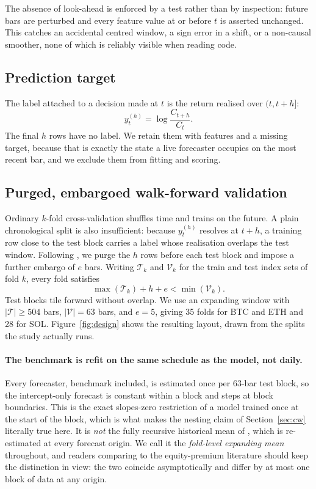 \documentclass{article}
\theoremstyle{plain}
\theoremstyle{definition}
\begin{document}
The absence of look-ahead is enforced by a test rather than by inspection: future
bars are perturbed and every feature value at or before $t$ is asserted unchanged.
This catches an accidental centred window, a sign error in a shift, or a
non-causal smoother, none of which is reliably visible when reading code.

\subsection{Prediction target}

The label attached to a decision made at $t$ is the return realised over
$(t, t+h]$:
%
\begin{equation}
  y_t^{(h)} = \log \frac{C_{t+h}}{C_t}.
\end{equation}
%
The final $h$ rows have no label. We retain them with features and a missing
target, because that is exactly the state a live forecaster occupies on the most
recent bar, and we exclude them from fitting and scoring.

\subsection{Purged, embargoed walk-forward validation}
\label{sec:cv}

Ordinary $k$-fold cross-validation shuffles time and trains on the future. A plain
chronological split is also insufficient: because $y_t^{(h)}$ resolves at $t+h$, a
training row close to the test block carries a label whose realisation overlaps
the test window. Following \citet{lopezdeprado2018}, we purge the $h$ rows before
each test block and impose a further embargo of $e$ bars. Writing $\mathcal{T}_k$
and $\mathcal{V}_k$ for the train and test index sets of fold $k$, every fold
satisfies
%
\begin{equation}
  \max(\mathcal{T}_k) + h + e < \min(\mathcal{V}_k).
  \label{eq:purge}
\end{equation}
%
Test blocks tile forward without overlap. We use an expanding window with
$|\mathcal{T}| \ge 504$ bars, $|\mathcal{V}| = 63$ bars, and $e = 5$, giving 35
folds for BTC and ETH and 28 for SOL. Figure~\ref{fig:design} shows the resulting
layout, drawn from the splits the study actually runs.

\paragraph{The benchmark is refit on the same schedule as the model, not daily.}
Every forecaster, benchmark included, is estimated once per 63-bar test block, so the
intercept-only forecast is constant within a block and steps at block boundaries. This is
the exact slopes-zero restriction of a model trained once at the start of the block, which is
what makes the nesting claim of Section~\ref{sec:cw} literally true here. It is \emph{not}
the fully recursive historical mean of \citet{welch2008}, which is re-estimated at every
forecast origin. We call it the \emph{fold-level expanding mean} throughout, and readers
comparing to the equity-premium literature should keep the distinction in view: the two
coincide asymptotically and differ by at most one block of data at any origin.
\end{document}
